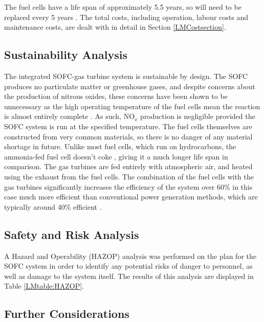 
The fuel cells have a life span of approximately 5.5 years, so will need to be replaced every 5 years \cite{LM24}. The total costs, including operation, labour costs and maintenance costs, are dealt with in detail in Section \ref{LMCostsection}.

\subsection{Sustainability Analysis}
The integrated SOFC-gas turbine system is sustainable by design. The SOFC produces no particulate matter or greenhouse gases, and despite concerns about the production of nitrous oxides, these concerns have been shown to be unnecessary as the high operating temperature of the fuel cells mean the reaction is almost entirely complete \cite{LM2}. As such, $\text{NO}_{x}$ production is negligible provided the SOFC system is run at the specified temperature. The fuel cells themselves are constructed from very common materials, so there is no danger of any material shortage in future. Unlike most fuel cells, which run on hydrocarbons, the ammonia-fed fuel cell doesn't coke \cite{LM10}, giving it a much longer life span in comparison. The gas turbines are fed entirely with atmospheric air, and heated using the exhaust from the fuel cells. The combination of the fuel cells with the gas turbines significantly increases the efficiency of the system \text{-} over 60\% in this case \text{-} much more efficient than conventional power generation methods, which are typically around 40\% efficient \cite{LM19}.

\subsection{Safety and Risk Analysis}
A Hazard and Operability (HAZOP) analysis was performed on the plan for the SOFC system in order to identify any potential risks of danger to personnel, as well as damage to the system itself. The results of this analysis are displayed in Table \ref{LMtable:HAZOP}.

\subsection{Further Considerations}

